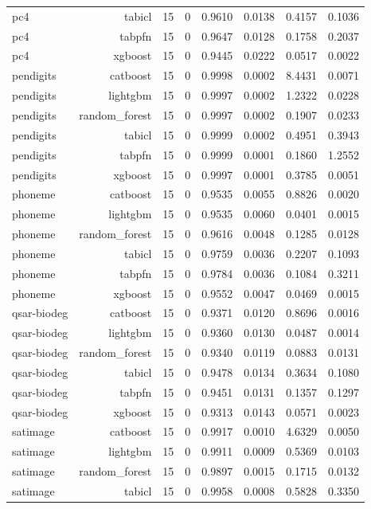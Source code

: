 \begin{table}[htbp]
\begin{tabular}{lrrrrrrr}
pc4 & tabicl & 15 & 0 & 0.9610 & 0.0138 & 0.4157 & 0.1036 \\
pc4 & tabpfn & 15 & 0 & 0.9647 & 0.0128 & 0.1758 & 0.2037 \\
pc4 & xgboost & 15 & 0 & 0.9445 & 0.0222 & 0.0517 & 0.0022 \\
pendigits & catboost & 15 & 0 & 0.9998 & 0.0002 & 8.4431 & 0.0071 \\
pendigits & lightgbm & 15 & 0 & 0.9997 & 0.0002 & 1.2322 & 0.0228 \\
pendigits & random\_forest & 15 & 0 & 0.9997 & 0.0002 & 0.1907 & 0.0233 \\
pendigits & tabicl & 15 & 0 & 0.9999 & 0.0002 & 0.4951 & 0.3943 \\
pendigits & tabpfn & 15 & 0 & 0.9999 & 0.0001 & 0.1860 & 1.2552 \\
pendigits & xgboost & 15 & 0 & 0.9997 & 0.0001 & 0.3785 & 0.0051 \\
phoneme & catboost & 15 & 0 & 0.9535 & 0.0055 & 0.8826 & 0.0020 \\
phoneme & lightgbm & 15 & 0 & 0.9535 & 0.0060 & 0.0401 & 0.0015 \\
phoneme & random\_forest & 15 & 0 & 0.9616 & 0.0048 & 0.1285 & 0.0128 \\
phoneme & tabicl & 15 & 0 & 0.9759 & 0.0036 & 0.2207 & 0.1093 \\
phoneme & tabpfn & 15 & 0 & 0.9784 & 0.0036 & 0.1084 & 0.3211 \\
phoneme & xgboost & 15 & 0 & 0.9552 & 0.0047 & 0.0469 & 0.0015 \\
qsar-biodeg & catboost & 15 & 0 & 0.9371 & 0.0120 & 0.8696 & 0.0016 \\
qsar-biodeg & lightgbm & 15 & 0 & 0.9360 & 0.0130 & 0.0487 & 0.0014 \\
qsar-biodeg & random\_forest & 15 & 0 & 0.9340 & 0.0119 & 0.0883 & 0.0131 \\
qsar-biodeg & tabicl & 15 & 0 & 0.9478 & 0.0134 & 0.3634 & 0.1080 \\
qsar-biodeg & tabpfn & 15 & 0 & 0.9451 & 0.0131 & 0.1357 & 0.1297 \\
qsar-biodeg & xgboost & 15 & 0 & 0.9313 & 0.0143 & 0.0571 & 0.0023 \\
satimage & catboost & 15 & 0 & 0.9917 & 0.0010 & 4.6329 & 0.0050 \\
satimage & lightgbm & 15 & 0 & 0.9911 & 0.0009 & 0.5369 & 0.0103 \\
satimage & random\_forest & 15 & 0 & 0.9897 & 0.0015 & 0.1715 & 0.0132 \\
satimage & tabicl & 15 & 0 & 0.9958 & 0.0008 & 0.5828 & 0.3350 \\

\end{tabular}
\end{table}
